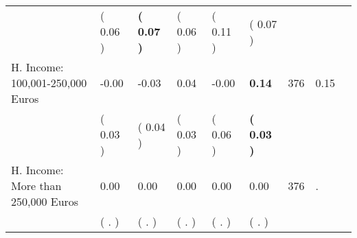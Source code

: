 \begin{tabular}{L{6.2cm} C{1.8cm} C{1.8cm} C{1.8cm} C{1.8cm} C{1.8cm} C{1.8cm} C{0.3cm} C{0.3cm}}
 & (     0.06 ) & \textbf{(     0.07 )} & (     0.06 ) & (     0.11 ) & (     0.07 )  & \\
H. Income: 100,001-250,000 Euros &     -0.00 &     -0.03 &      0.04 &     -0.00 & \textbf{     0.14}  & 376 &       0.15 \\ 
 & (     0.03 ) & (     0.04 ) & (     0.03 ) & (     0.06 ) & \textbf{(     0.03 )}  & \\
H. Income: More than 250,000 Euros &      0.00 &      0.00 &      0.00 &      0.00 &      0.00  & 376 &          . \\ 
 & (        . ) & (        . ) & (        . ) & (        . ) & (        . )  & \\
\bottomrule
\end{tabular}
